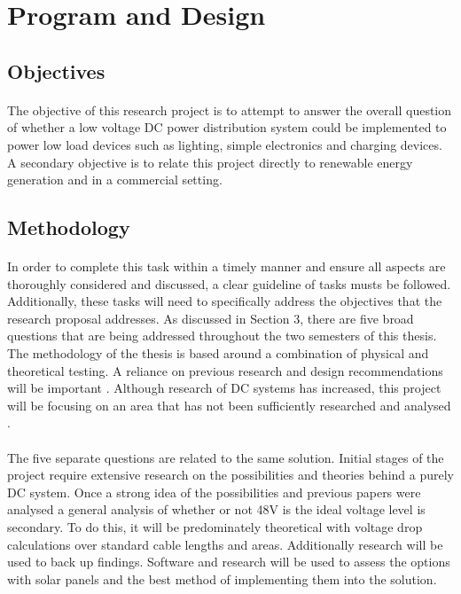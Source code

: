 \section{Program and Design}  


\subsection{Objectives}

\paragraph{}
The objective of this research project is to attempt to answer the overall question of whether a low voltage DC power distribution system could be implemented to power low load devices such as lighting, simple electronics and charging devices. A secondary objective is to relate this project directly to renewable energy generation and in a commercial setting.

\subsection{Methodology}

\paragraph{}
In order to complete this task within a timely manner and ensure all aspects are thoroughly considered and discussed, a clear guideline of tasks musts be followed. Additionally, these tasks will need to specifically address the objectives that the research proposal addresses. As discussed in Section 3, there are five broad questions that are being addressed throughout the two semesters of this thesis. The methodology of the thesis is based around a combination of physical and theoretical testing. A reliance on previous research and design recommendations will be important \cite{Amin2011}. Although research of DC systems has increased, this project will be focusing on an area that has not been sufficiently researched and analysed \cite{Pellis1997}.   

\paragraph{}
The five separate questions are related to the same solution. Initial stages of the project require extensive research on the possibilities and theories behind a purely DC system. Once a strong idea of the possibilities and previous papers were analysed a general analysis of whether or not 48V is the ideal voltage level is secondary. To do this, it will be predominately theoretical with voltage drop calculations over standard cable lengths and areas. Additionally research will be used to back up findings. Software and research will be used to assess the options with solar panels and the best method of implementing them into the solution. 

